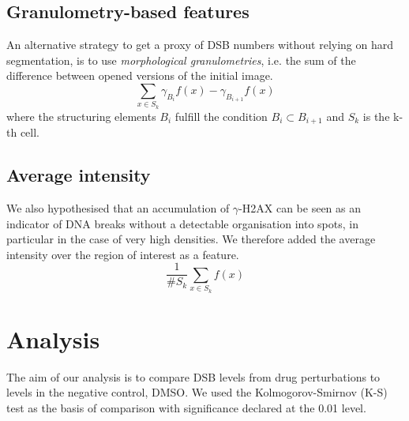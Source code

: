 \subsection{Granulometry-based features}

An alternative strategy to get a proxy of DSB numbers without relying on hard segmentation, is to use \emph{morphological granulometries}, i.e. the sum of the difference between opened versions of the initial image.
\begin{equation}
\sum_{x \in S_k} \gamma_{B_i}f(x) - \gamma_{B_{i+1}}f(x)
\end{equation}
where the structuring elements $B_i$ fulfill the condition $B_{i} \subset B_{i+1}$ and $S_k$ is the k-th cell.  

\subsection{Average intensity}

We also hypothesised that an accumulation of $\gamma$-H2AX can be seen as an indicator of DNA breaks without a detectable organisation into spots, in particular in the case of very high densities. We therefore added the average intensity over the region of interest as a feature.
\begin{equation}
\frac{1}{\#S_k}\sum_{x \in S_k}f(x)
\end{equation}

\section{Analysis}
\label{sec:analysis}

The aim of our analysis is to compare DSB levels from drug perturbations to levels in the negative control, DMSO. We used the Kolmogorov-Smirnov (K-S) test as the basis of comparison with significance declared at the 0.01 level.

